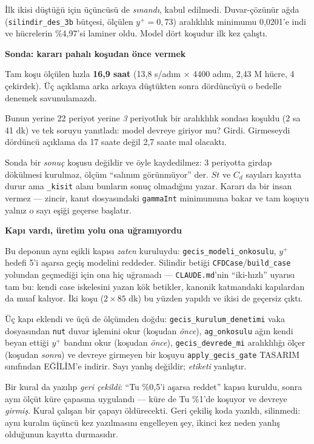 \documentclass[11pt,a4paper]{article}
\newcommand{\kkkenar}{lacivert}
\newcommand{\kkzemin}{kod}
\newenvironment{renkkutu}[3]{%
  \renewcommand{\kkkenar}{#1}\renewcommand{\kkzemin}{#2}%
  \par\medskip\noindent
  \begin{lrbox}{\kutugovde}%
  \begin{minipage}{\dimexpr\linewidth-2\fboxsep-2\fboxrule\relax}\footnotesize
  \textcolor{#1}{\textbf{#3}}\par\vspace{3pt}%
}{%
  \end{minipage}%
  \end{lrbox}%
  \noindent\fcolorbox{\kkkenar}{\kkzemin}{\usebox{\kutugovde}}%
  \par\medskip
}
\newenvironment{dikkat}[1]{\begin{renkkutu}{orta}{ortabg}{#1}}{\end{renkkutu}}
\begin{document}
\noindent İlk ikisi düştüğü için üçüncüsü de \emph{sınandı}, kabul edilmedi.
Duvar-çözünür ağda (\texttt{silindir\_des\_3b} bütçesi, ölçülen $y^+ = 0{,}73$)
aralıklılık minimumu 0{,}0201'e indi ve hücrelerin \%4{,}97'si laminer oldu.
Model dört koşudur ilk kez çalıştı.

\begin{dikkat}{Sonda: kararı pahalı koşudan önce vermek}
Tam koşu ölçülen hızla \textbf{16{,}9 saat} (13{,}8 s/adım $\times$ 4400 adım,
2{,}43 M hücre, 4 çekirdek). Üç açıklama arka arkaya düştükten sonra dördüncüyü
o bedelle denemek savunulamazdı.

Bunun yerine 22 periyot yerine \emph{3} periyotluk bir aralıklılık sondası
koşuldu (2 sa 41 dk) ve tek soruyu yanıtladı: model devreye giriyor mu?
Girdi. Girmeseydi dördüncü açıklama da 17 saate değil 2{,}7 saate mal olacaktı.

Sonda bir \emph{sonuç} koşusu değildir ve öyle kaydedilmez: 3 periyotta girdap
dökülmesi kurulmaz, ölçüm ``salınım görünmüyor'' der. $St$ ve $C_d$ sayıları
kayıtta durur ama \texttt{\_kisit} alanı bunların sonuç olmadığını yazar.
Kararı da bir insan vermez --- zincir, kanıt dosyasındaki \texttt{gammaInt}
minimumuna bakar ve tam koşuyu yalnız o sayı eşiği geçerse başlatır.
\end{dikkat}

\begin{dikkat}{Kapı vardı, üretim yolu ona uğramıyordu}
Bu deponun aynı eşikli kapısı \emph{zaten} kuruluydu:
\texttt{gecis\_modeli\_onkosulu}, $y^+$ hedefi 5'i aşarsa geçiş modelini
reddeder. Silindir betiği \texttt{CFDCase}/\texttt{build\_case} yolundan
geçmediği için ona hiç uğramadı --- \texttt{CLAUDE.md}'nin ``iki-hızlı''
uyarısı tam bu: kendi case iskelesini yazan kök betikler, kanonik
katmandaki kapılardan da muaf kalıyor. İki koşu ($2\times 85$ dk) bu yüzden
yapıldı ve ikisi de geçersiz çıktı.

Üç kapı eklendi ve üçü de ölçümden doğdu:
\texttt{gecis\_kurulum\_denetimi} vaka dosyasından \texttt{nut} duvar
işlemini okur (koşudan \emph{önce}), \texttt{ag\_onkosulu} ağın kendi beyan
ettiği $y^+$ bandını okur (koşudan \emph{önce}), \texttt{gecis\_devrede\_mi}
aralıklılığı ölçer (koşudan \emph{sonra}) ve devreye girmeyen bir koşuyu
\texttt{apply\_gecis\_gate} TASARIM sınıfından EĞİLİM'e indirir. Sayı yanlış
değildir; \emph{etiketi} yanlıştır.

Bir kural da yazılıp \emph{geri çekildi}: ``Tu \%0{,}5'i aşarsa reddet''
kapısı kuruldu, sonra aynı ölçüt küre çapasına uygulandı --- küre de Tu \%1'de
koşuyor ve devreye \emph{girmiş}. Kural çalışan bir çapayı öldürecekti. Geri
çekiliş koda yazıldı, silinmedi: aynı kuralın üçüncü kez yazılmasını
engelleyen şey, ikinci kez neden yanlış olduğunun kayıtta durmasıdır.
\end{dikkat}
\end{document}

